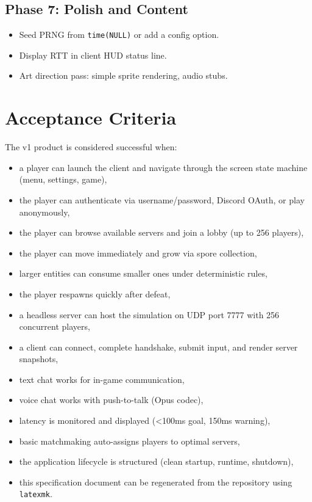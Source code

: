 \documentclass[11pt]{article}
\begin{document}
\subsection{Phase 7: Polish and Content}

\begin{itemize}
  \item Seed PRNG from \texttt{time(NULL)} or add a config option.
  \item Display RTT in client HUD status line.
  \item Art direction pass: simple sprite rendering, audio stubs.
\end{itemize}

\section{Acceptance Criteria}

The v1 product is considered successful when:

\begin{itemize}
  \item a player can launch the client and navigate through the screen state machine (menu, settings, game),
  \item the player can authenticate via username/password, Discord OAuth, or play anonymously,
  \item the player can browse available servers and join a lobby (up to 256 players),
  \item the player can move immediately and grow via spore collection,
  \item larger entities can consume smaller ones under deterministic rules,
  \item the player respawns quickly after defeat,
  \item a headless server can host the simulation on UDP port 7777 with 256 concurrent players,
  \item a client can connect, complete handshake, submit input, and render server snapshots,
  \item text chat works for in-game communication,
  \item voice chat works with push-to-talk (Opus codec),
  \item latency is monitored and displayed (<100ms goal, 150ms warning),
  \item basic matchmaking auto-assigns players to optimal servers,
  \item the application lifecycle is structured (clean startup, runtime, shutdown),
  \item this specification document can be regenerated from the repository using \texttt{latexmk}.
\end{itemize}
\end{document}
